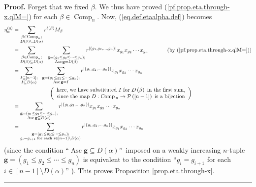 \documentclass[numbers=enddot,12pt,final,onecolumn,notitlepage]{scrartcl}%
\theoremstyle{definition}
\newenvironment{proof}[1][Proof]{\noindent\textbf{#1.} }{\ \rule{0.5em}{0.5em}}
\let\sumnonlimits\sum
\renewcommand{\sum}{\sumnonlimits\limits}
\newenvironment{vershort}{}{}
\begin{document}
\begin{vershort}
\begin{proof}
Forget that we fixed $\beta$. We thus have proved
(\ref{pf.prop.eta.through-x.qlM=}) for each $\beta\in\operatorname*{Comp}%
\nolimits_{n}$. Now, (\ref{eq.def.etaalpha.def}) becomes%
\begin{align*}
\eta_{\alpha}^{\left(  q\right)  }  &  =\sum_{\substack{\beta\in
\operatorname*{Comp}\nolimits_{n};\\D\left(  \beta\right)  \subseteq D\left(
\alpha\right)  }}r^{\ell\left(  \beta\right)  }M_{\beta}\\
&  =\sum_{\substack{\beta\in\operatorname*{Comp}\nolimits_{n};\\D\left(
\beta\right)  \subseteq D\left(  \alpha\right)  }}\ \ \sum
_{\substack{\mathbf{g}=\left(  g_{1}\leq g_{2}\leq\cdots\leq g_{n}\right)
;\\\operatorname*{Asc}\mathbf{g}=D\left(  \beta\right)  }}r^{\left\vert
\left\{  g_{1},g_{2},\ldots,g_{n}\right\}  \right\vert }x_{g_{1}}x_{g_{2}%
}\cdots x_{g_{n}}\ \ \ \ \ \ \ \ \ \ \left(  \text{by
(\ref{pf.prop.eta.through-x.qlM=})}\right) \\
&  =\sum_{\substack{I\subseteq\left[  n-1\right]  ;\\I\subseteq D\left(
\alpha\right)  }}\ \ \sum_{\substack{\mathbf{g}=\left(  g_{1}\leq g_{2}%
\leq\cdots\leq g_{n}\right)  ;\\\operatorname*{Asc}\mathbf{g}=I}}r^{\left\vert
\left\{  g_{1},g_{2},\ldots,g_{n}\right\}  \right\vert }x_{g_{1}}x_{g_{2}%
}\cdots x_{g_{n}}\\
&  \ \ \ \ \ \ \ \ \ \ \ \ \ \ \ \ \ \ \ \ \left(
\begin{array}
[c]{c}%
\text{here, we have substituted }I\text{ for }D\left(  \beta\right)  \text{ in
the first sum,}\\
\text{since the map }D:\operatorname*{Comp}{}_{n}\rightarrow\mathcal{P}\left(
\left[  n-1\right]  \right)  \text{ is a bijection}%
\end{array}
\right) \\
&  =\sum_{\substack{\mathbf{g}=\left(  g_{1}\leq g_{2}\leq\cdots\leq
g_{n}\right)  ;\\\operatorname*{Asc}\mathbf{g}\subseteq D\left(
\alpha\right)  }}r^{\left\vert \left\{  g_{1},g_{2},\ldots,g_{n}\right\}
\right\vert }x_{g_{1}}x_{g_{2}}\cdots x_{g_{n}}\\
&  =\sum_{\substack{\mathbf{g}=\left(  g_{1}\leq g_{2}\leq\cdots\leq
g_{n}\right)  ;\\g_{i}=g_{i+1}\text{ for each }i\in\left[  n-1\right]
\setminus D\left(  \alpha\right)  }}r^{\left\vert \left\{  g_{1},g_{2}%
,\ldots,g_{n}\right\}  \right\vert }x_{g_{1}}x_{g_{2}}\cdots x_{g_{n}}%
\end{align*}
(since the condition \textquotedblleft$\operatorname*{Asc}\mathbf{g}\subseteq
D\left(  \alpha\right)  $\textquotedblright\ imposed on a weakly increasing
$n$-tuple $\mathbf{g}=\left(  g_{1}\leq g_{2}\leq\cdots\leq g_{n}\right)  $ is
equivalent to the condition \textquotedblleft$g_{i}=g_{i+1}$ for each
$i\in\left[  n-1\right]  \setminus D\left(  \alpha\right)  $\textquotedblright%
). This proves Proposition \ref{prop.eta.through-x}.
\end{proof}
\end{vershort}
\end{document}
